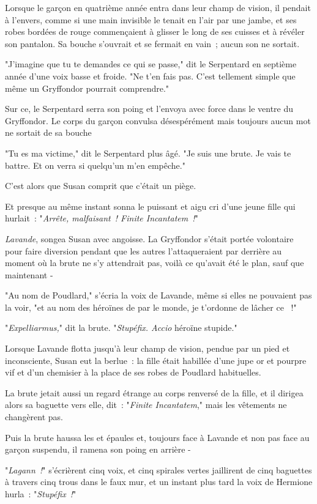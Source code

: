 Lorsque le garçon en quatrième année entra dans leur champ de vision, il pendait à l'envers, comme si une main invisible le tenait en l'air par une jambe, et ses robes bordées de rouge commençaient à glisser le long de ses cuisses et à révéler son pantalon. Sa bouche s'ouvrait et se fermait en vain~; aucun son ne sortait.

"J'imagine que tu te demandes ce qui se passe," dit le Serpentard en septième année d'une voix basse et froide. "Ne t'en fais pas. C'est tellement simple que même un Gryffondor pourrait comprendre."

Sur ce, le Serpentard serra son poing et l'envoya avec force dans le ventre du Gryffondor. Le corps du garçon convulsa désespérément mais toujours aucun mot ne sortait de sa bouche

"Tu es ma victime," dit le Serpentard plus âgé. "Je suis une brute. Je vais te battre. Et on verra si quelqu'un m'en empêche."

C'est alors que Susan comprit que c'était un piège.

Et presque au même instant sonna le puissant et aigu cri d'une jeune fille qui hurlait~: "\emph{Arrête, malfaisant~! Finite Incantatem~!}"

\emph{Lavande}, songea Susan avec angoisse. La Gryffondor s'était portée volontaire pour faire diversion pendant que les autres l'attaqueraient par derrière au moment où la brute ne s'y attendrait pas, voilà ce qu'avait été le plan, sauf que maintenant -

"Au nom de Poudlard," s'écria la voix de Lavande, même si elles ne pouvaient pas la voir, "et au nom des héroïnes de par le monde, je t'ordonne de lâcher ce ~!"

"\emph{Expelliarmus,}" dit la brute. "\emph{Stupéfix. Accio} héroïne stupide."

Lorsque Lavande flotta jusqu'à leur champ de vision, pendue par un pied et inconsciente, Susan eut la berlue~: la fille était habillée d'une jupe or et pourpre vif et d'un chemisier à la place de ses robes de Poudlard habituelles.

La brute jetait aussi un regard étrange au corps renversé de la fille, et il dirigea alors sa baguette vers elle, dit~: "\emph{Finite Incantatem}," mais les vêtements ne changèrent pas.

Puis la brute haussa les et épaules et, toujours face à Lavande et non pas face au garçon suspendu, il ramena son poing en arrière -

"\emph{Lagann~!}" s'écrièrent cinq voix, et cinq spirales vertes jaillirent de cinq baguettes à travers cinq trous dans le faux mur, et un instant plus tard la voix de Hermione hurla~: "\emph{Stupéfix~!}"

